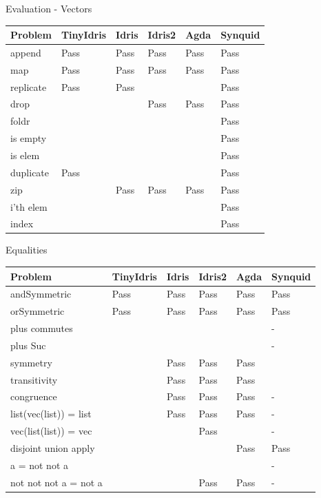 \documentclass[presentation]{beamer}
\begin{document}
\begin{frame}[fragile]{Evaluation - Vectors}
\begin{center}
\begin{tabular}{|l|l|l|l|l|l|}
\hline
Problem & TinyIdris & Idris & Idris2 & Agda & Synquid \\
\hline
append & Pass & Pass & Pass & Pass & Pass\\
map & Pass  & Pass & Pass & Pass & Pass\\
replicate & Pass & Pass & &   & Pass\\
drop &   &   & Pass & Pass  & Pass\\
foldr &   &   &   &   & Pass\\
is empty &   &   &   &   & Pass\\
is elem &   &   &   &   & Pass\\
duplicate & Pass &   &   &   & Pass\\
zip &   & Pass & Pass & Pass  & Pass\\
i'th elem &   &   &   &   & Pass\\
index &   &   &   &   & Pass\\
\hline
\end{tabular}
\end{center}
\end{frame}

\begin{frame}[fragile]{Equalities}
  \begin{center}
\begin{tabular}{|l|l|l|l|l|l|}
\hline
Problem & TinyIdris & Idris & Idris2 & Agda & Synquid\\
\hline
andSymmetric & Pass & Pass & Pass & Pass & Pass \\
orSymmetric &  Pass & Pass & Pass & Pass & Pass \\
plus commutes &   &   &   & & - \\
plus Suc &   &   &   &  & - \\
symmetry &   & Pass & Pass & Pass & \\
transitivity &   & Pass & Pass & Pass & \\
congruence &   & Pass & Pass & Pass & - \\
list(vec(list)) = list &   & Pass & Pass & Pass & - \\
vec(list(list)) = vec &   &   & Pass &  & - \\
disjoint union apply &   &   &   & Pass & Pass \\
a = not not a &   &   &   &  & -\\
not not not a = not a &   &   & Pass & Pass & - \\
\hline
\end{tabular}
\end{center}
\end{frame}
\end{document}

